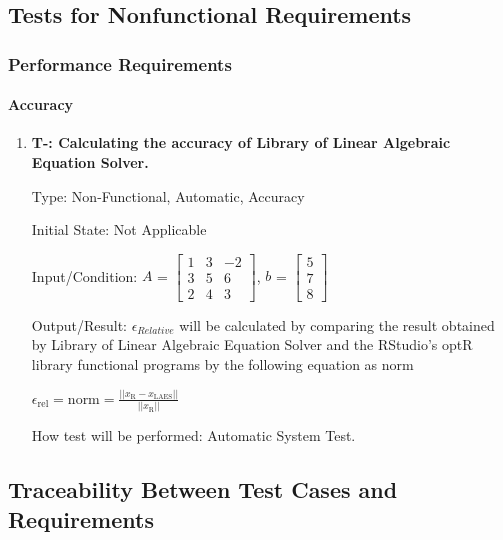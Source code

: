 \documentclass[12pt, titlepage]{article}
\newcounter{tnum}
\begin{document}
\subsection{Tests for Nonfunctional Requirements}

\subsubsection{Performance Requirements}
		

\paragraph{Accuracy}

\begin{enumerate}

\item{\textbf{T-\thetnum \label{t-accuracy}: Calculating the
accuracy of Library of Linear Algebraic Equation Solver.}}


Type: Non-Functional, Automatic, Accuracy
					
Initial State: Not Applicable
					
Input/Condition: $A$ = $\begin{bmatrix} 
1 & 3 & -2 \\
3 & 5 & 6\\
2 & 4 & 3
\end{bmatrix}$, $b$ = $\begin{bmatrix} 
5\\
7\\
8 
\end{bmatrix}$
					
Output/Result: $\epsilon_{Relative}$ will be calculated by comparing the result
obtained by Library of Linear Algebraic Equation Solver and the RStudio's optR library
functional programs by the following equation as norm

\begin{center}
 $\epsilon_\text{rel} = \text{norm} = \frac{||x_\text{R} - x_\text{LAES}||}{||x_\text{R}||}$
\end{center}
					
How test will be performed: Automatic System Test.
					
\end{enumerate}



\subsection{Traceability Between Test Cases and Requirements}
\end{document}

